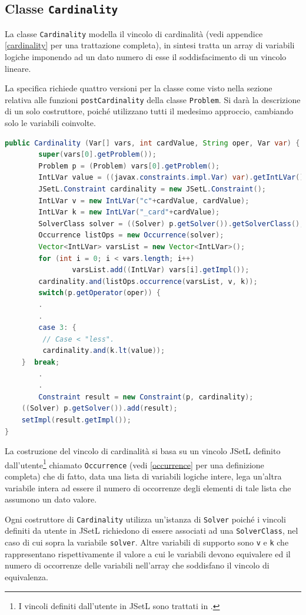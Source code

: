 \subsection{Classe \texttt{Cardinality}}\label{Cardinality}
La classe \texttt{Cardinality} modella il vincolo di cardinalità (vedi appendice
\ref{cardinality} per una trattazione completa), in sintesi
tratta un array di variabili logiche imponendo ad un dato numero di esse il 
soddisfacimento di un vincolo lineare.

La specifica richiede quattro versioni per la classe come visto nella
sezione relativa alle funzioni \texttt{postCardinality} della classe
\texttt{Problem}. Si darà la descrizione di un solo costruttore, poiché 
utilizzano tutti il medesimo approccio, cambiando solo le variabili coinvolte.
\begin{lstlisting}[language = Java,
                   caption = {\texttt{Cardinality}.}]
public Cardinality (Var[] vars, int cardValue, String oper, Var var) {
        super(vars[0].getProblem());
        Problem p = (Problem) vars[0].getProblem();
        IntLVar value = ((javax.constraints.impl.Var) var).getIntLVar();
        JSetL.Constraint cardinality = new JSetL.Constraint();
        IntLVar v = new IntLVar("c"+cardValue, cardValue);
        IntLVar k = new IntLVar("_card"+cardValue);
        SolverClass solver = ((Solver) p.getSolver()).getSolverClass();
        Occurrence listOps = new Occurrence(solver);
        Vector<IntLVar> varsList = new Vector<IntLVar>();
        for (int i = 0; i < vars.length; i++)
                varsList.add((IntLVar) vars[i].getImpl());
        cardinality.and(listOps.occurrence(varsList, v, k));
        switch(p.getOperator(oper)) {
        .
        .
        case 3: {
	     // Case < "less".
	     cardinality.and(k.lt(value));
	}  break;
        .
        .
        Constraint result = new Constraint(p, cardinality);
	((Solver) p.getSolver()).add(result);
	setImpl(result.getImpl());
}
\end{lstlisting}
La costruzione del vincolo di cardinalità si basa su un vincolo JSetL
definito dall'utente\footnote{I vincoli definiti dall'utente in JSetL sono 
trattati in \cite{jsetlMan}.} chiamato \texttt{Occurrence} (vedi 
\ref{occurrence}
per una definizione completa) che di fatto, data una lista di variabili logiche
intere, lega un'altra variabile intera ad
essere il numero di occorrenze degli elementi di tale lista che assumono un 
dato valore.

Ogni costruttore di \texttt{Cardinality} utilizza un'istanza di \texttt{Solver}
poiché i vincoli definiti da utente in JSetL richiedono di essere associati
ad una \texttt{SolverClass}, nel caso di cui sopra la variabile \texttt{solver}.
Altre variabili di supporto sono \texttt{v} e \texttt{k} che rappresentano
rispettivamente il valore a cui le variabili devono equivalere ed il numero
di occorrenze delle variabili nell'array che soddisfano il vincolo di 
equivalenza. 

